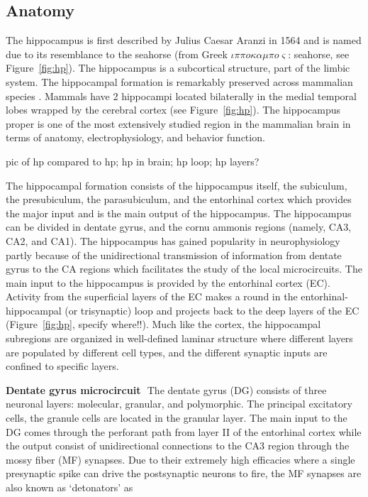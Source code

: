   \subsection{Anatomy}
    The hippocampus is first described by Julius Caesar Aranzi in 1564 and is
    named due to its resemblance to the seahorse (from Greek $\iota \pi \pi o
    \kappa \alpha \mu \pi o \varsigma$: seahorse, see Figure~\ref{fig:hp}). The
    hippocampus is a subcortical structure, part of the limbic system. The
    hippocampal formation is remarkably preserved across mammalian species
    \citep{Manns2006, Clark2013}. Mammals have 2 hippocampi located bilaterally
    in the medial temporal lobes wrapped by the cerebral cortex (see
    Figure~\ref{fig:hp}). The hippocampus  proper is one of the most
    extensively studied region in the mammalian brain in terms of anatomy,
    electrophysiology, and behavior function.

    pic of hp compared to hp; hp in brain; hp loop; hp layers?
    \label{fig:hp}

    The hippocampal formation consists of the hippocampus itself, the
    subiculum, the presubiculum, the parasubiculum, and the entorhinal cortex
    which provides the major input and is the main output of the hippocampus.
    The hippocampus can be divided in dentate gyrus, and the cornu ammonis
    regions (namely, CA3, CA2, and CA1). The hippocampus has gained popularity
    in neurophysiology partly because of the unidirectional transmission of
    information from dentate gyrus to the CA regions which facilitates the
    study of the local microcircuits. The main input to the hippocampus is
    provided by the entorhinal cortex (EC). Activity from the superficial
    layers of the EC makes a round in the entorhinal-hippocampal (or
    trisynaptic) loop and projects back to the deep layers of the EC
    (Figure~\ref{fig:hp}, specify where!!). Much like the cortex, the
    hippocampal subregions are organized in well-defined laminar structure
    where different layers are populated by different cell types, and the
    different synaptic inputs are confined to specific layers. 

    \textbf{Dentate gyrus microcircuit}\,\,
    The dentate gyrus (DG) consists of three neuronal layers: molecular,
    granular, and polymorphic. The principal excitatory cells, the granule
    cells are located in the granular layer. The main input to the DG comes
    through the perforant path from layer II of the entorhinal cortex
    \citep{Squire1992} while the output consist of unidirectional connections
    to the CA3 region through the mossy fiber (MF) synapses. Due to their
    extremely high efficacies where a single presynaptic spike can drive the
    postsynaptic neurons to fire, the MF synapses are also known as
    `detonators' as

